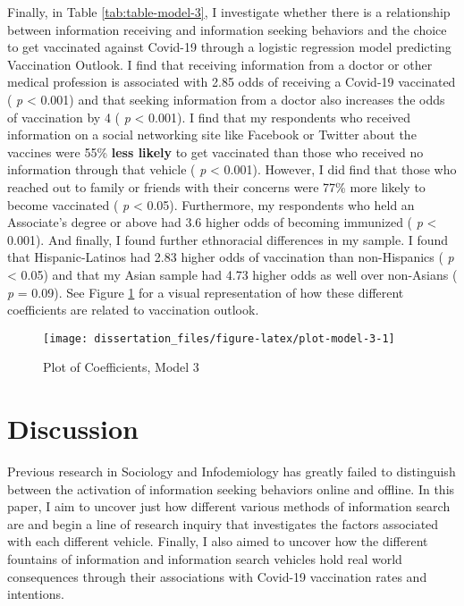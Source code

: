 Finally, in Table \ref{tab:table-model-3}, I investigate whether there is a
relationship between information receiving and information seeking behaviors and
the choice to get vaccinated against Covid-19 through a logistic regression
model predicting Vaccination Outlook. I find that receiving information from a
doctor or other medical profession is associated with
2.85 odds of receiving
a Covid-19 vaccinated ( \emph{p} \textless{} 0.001) and that seeking information from a doctor
also increases the odds of vaccination by
4 ( \emph{p} \textless{} 0.001).
I find that my respondents who received information on a social networking site
like Facebook or Twitter about the vaccines were
55\%
\textbf{less likely} to get vaccinated than those who received no information through
that vehicle ( \emph{p} \textless{} 0.001). However, I did find that those who reached out to
family or friends with their concerns were
77\% more likely
to become vaccinated ( \emph{p} \textless{} 0.05). Furthermore, my respondents who held an
Associate's degree or above had 3.6
higher odds of becoming immunized ( \emph{p} \textless{} 0.001). And finally, I found further
ethnoracial differences in my sample. I found that Hispanic-Latinos had
2.83 higher odds of vaccination
than non-Hispanics ( \emph{p} \textless{} 0.05) and that my Asian sample had
4.73 higher odds as well over
non-Asians ( \emph{p} = 0.09). See Figure \ref{fig:plot-model-3} for a visual
representation of how these different coefficients are related to vaccination
outlook.

\begin{figure}

{\centering \texttt{[image: dissertation\_files/figure-latex/plot-model-3-1]} 

}

\caption{Plot of Coefficients, Model 3}\label{fig:plot-model-3}
\end{figure}

\hypertarget{discussion}{%
\section{Discussion}\label{discussion}}

Previous research in Sociology and Infodemiology has greatly failed to
distinguish between the activation of information seeking behaviors online and
offline. In this paper, I aim to uncover just how different various methods of
information search are and begin a line of research inquiry that investigates
the factors associated with each different vehicle. Finally, I also aimed to
uncover how the different fountains of information and information search
vehicles hold real world consequences through their associations with Covid-19
vaccination rates and intentions.

